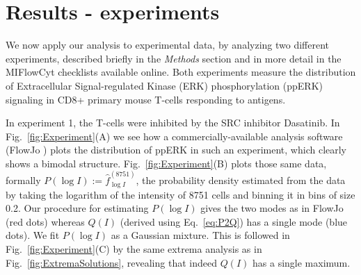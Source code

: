 \documentclass[11pt,a4paper,final]{article}
\begin{document}
\section*{Results - experiments}

We now apply our analysis to experimental data, by analyzing two different experiments, described briefly in the \emph{Methods} section and in more detail in the MIFlowCyt checklists available online. Both experiments measure the distribution of Extracellular Signal-regulated Kinase (ERK) phosphorylation (ppERK) signaling in CD8+ primary mouse T-cells responding to antigens. 

\smallskip
In experiment 1, the T-cells were inhibited by the SRC inhibitor Dasatinib. In Fig.~\ref{fig:Experiment}(A) we see how a commercially-available analysis software (FlowJo \cite{FlowJo}) plots the distribution of ppERK in such an experiment, which clearly shows a bimodal structure. Fig.~\ref{fig:Experiment}(B) plots those same data, formally $P(\log I) := \hat{f}_{\log I}^{(8751)}$, the probability density estimated from the data by taking the logarithm of the intensity of 8751 cells and binning it in bins of size 0.2. Our procedure for estimating $P(\log I)$ gives the two modes as in FlowJo (red dots) whereas $Q(I)$ (derived using Eq.~\ref{eq:P2Q}) has a single mode (blue dots). We fit $P(\log I)$ as a Gaussian mixture. This is followed in Fig.~\ref{fig:Experiment}(C) by the same extrema analysis as in Fig.~\ref{fig:ExtremaSolutions}, revealing that indeed $Q(I)$ has a single maximum.
\smallskip
\end{document}
